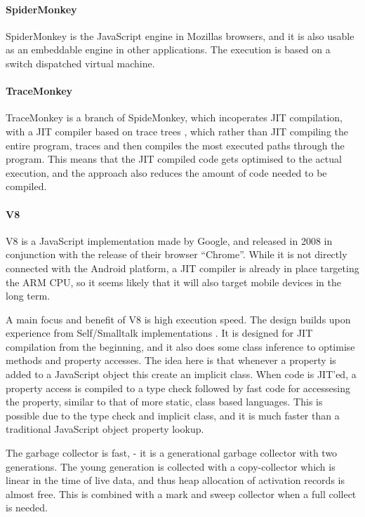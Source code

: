 \documentclass[11pt]{report}
\begin{document}
\paragraph{SpiderMonkey}
\label{spidermonkey}
SpiderMonkey \cite{spidermonkey} is the JavaScript engine in Mozillas browsers, and it is also usable as an embeddable engine in other applications. The execution is based on a switch dispatched virtual machine. %

\paragraph{TraceMonkey} 
TraceMonkey is a branch of SpideMonkey, which incoperates JIT compilation, with a JIT compiler based on trace trees \cite{trace-tree}, 
which rather than JIT compiling the entire program,
traces and then compiles the most executed paths through the program.
This means that the JIT compiled code gets optimised to the actual execution,
and the approach also reduces the amount of code needed to be compiled.

\paragraph{V8} V8 \cite{v8} is a JavaScript implementation made by Google, and released in 2008 in conjunction with the release of their browser ``Chrome''. 
While it is not directly connected with the Android platform, a JIT compiler is already in place targeting the ARM CPU, so it seems likely that it will also target mobile devices in the long term.

A main focus and benefit of V8 is high execution speed.
The design builds upon experience from Self/Smalltalk implementations \cite{articles-before-v8}.
It is designed for JIT compilation from the beginning, and it also does some class inference to optimise methods and property accesses.
The idea here is that whenever a property is added to a JavaScript object this create an implicit class. When code is JIT'ed, a property access is compiled to a type check followed by fast code for accessesing the property, similar to that of more static, class based languages. This is possible due to the type check and implicit class, and it is much faster than a traditional JavaScript object property lookup.

The garbage collector is fast, - it is a generational garbage collector with two generations. The young generation is collected with a copy-collector which is linear in the time of live data, and thus heap allocation of activation records is almost free. 
This is combined with a mark and sweep collector when a full collect is needed.
\end{document}
